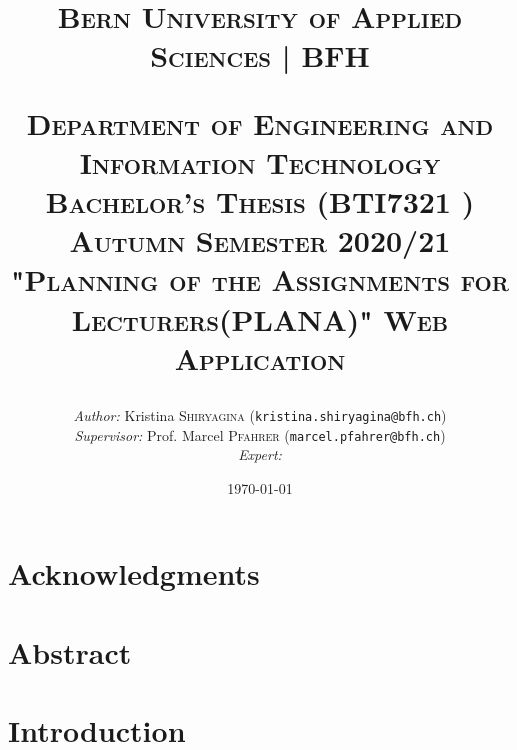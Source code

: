 \documentclass{scrartcl}
\begin{document}
\begin{titlepage}


\title{\textsc{\LARGE Bern University of Applied Sciences | BFH }\\[1cm]
\begin{center}
\end{center}
\textsc{\small Department of Engineering and Information Technology}\\
\textsc{\small Bachelor's Thesis (BTI7321 ) Autumn Semester 2020/21}\\[1cm]
\textsc{"Planning of the Assignments for Lecturers(PLANA)" Web Application}}
\date{\today}   %
\author{\textit{Author: }Kristina \textsc{Shiryagina} (\texttt{kristina.shiryagina@bfh.ch}) \\
 \textit{Supervisor: } Prof. Marcel \textsc{Pfahrer}  (\texttt{marcel.pfahrer@bfh.ch})\\
 \textit{Expert: }  \textsc{} \\
 }
\maketitle	

\newpage


	
\tableofcontents
\clearpage
\end{titlepage}

\setcounter{secnumdepth}{-2}%





\section{Acknowledgments}


\section{Abstract}


\setcounter{secnumdepth}{2}  %



\section{Introduction}
\end{document}
